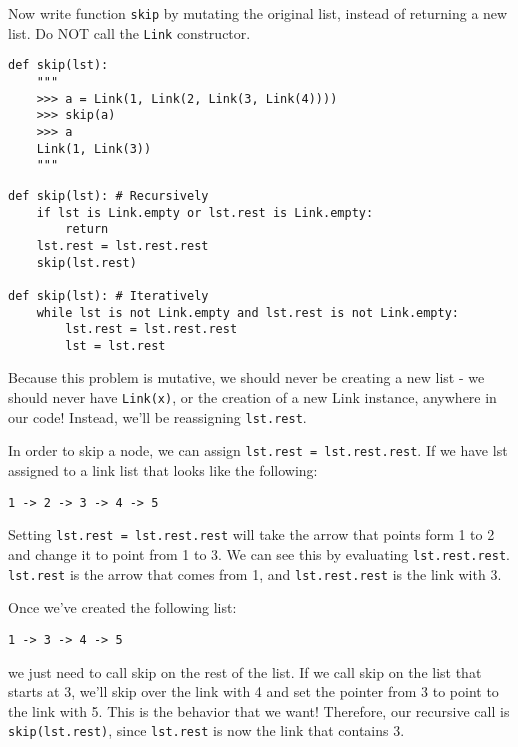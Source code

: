 \begin{blocksection}
\question Now write function \texttt{skip} by mutating the original list, instead of returning a new list. Do NOT call the \texttt{Link} constructor.

\begin{lstlisting}
def skip(lst):
    """
    >>> a = Link(1, Link(2, Link(3, Link(4))))
    >>> skip(a)
    >>> a
    Link(1, Link(3))
    """
\end{lstlisting}

\begin{solution}[1in]
\begin{lstlisting}
def skip(lst): # Recursively
    if lst is Link.empty or lst.rest is Link.empty:
        return
    lst.rest = lst.rest.rest
    skip(lst.rest)

def skip(lst): # Iteratively
    while lst is not Link.empty and lst.rest is not Link.empty:
        lst.rest = lst.rest.rest
        lst = lst.rest
\end{lstlisting}
Because this problem is mutative, we should never be creating a new list - we should never have \lstinline{Link(x)}, or the creation of a new Link instance, anywhere in our code! Instead, we’ll be reassigning \lstinline{lst.rest}.

In order to skip a node, we can assign \lstinline{lst.rest = lst.rest.rest}. If we have lst assigned to a link list that looks like the following:
\begin{lstlisting}
1 -> 2 -> 3 -> 4 -> 5
\end{lstlisting}
Setting \lstinline{lst.rest = lst.rest.rest} will take the arrow that points form 1 to 2 and change it to point from 1 to 3. We can see this by evaluating \lstinline{lst.rest.rest}. \lstinline{lst.rest} is the arrow that comes from 1, and \lstinline{lst.rest.rest} is the link with 3.

Once we’ve created the following list:
\begin{lstlisting}
1 -> 3 -> 4 -> 5
\end{lstlisting}
we just need to call skip on the rest of the list. If we call skip on the list that starts at 3, we’ll skip over the link with 4 and set the pointer from 3 to point to the link with 5. This is the behavior that we want! Therefore, our recursive call is \lstinline{skip(lst.rest)}, since \lstinline{lst.rest} is now the link that contains 3.

\end{solution}

\end{blocksection}
